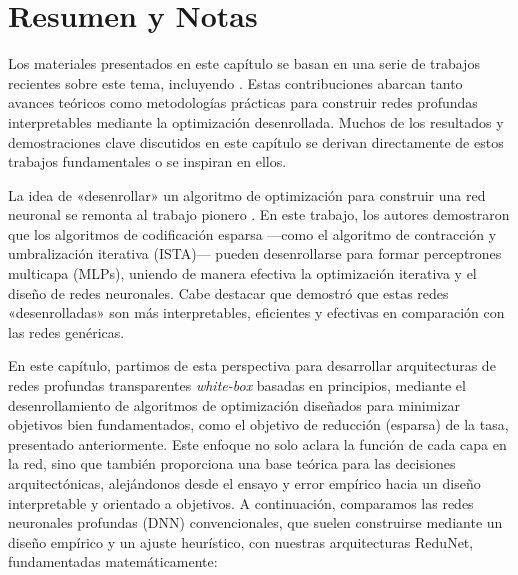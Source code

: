 \documentclass[../../book-main.tex]{subfiles}
\begin{document}
\section{Resumen y Notas}

Los materiales presentados en este capítulo se basan en una serie de
trabajos recientes sobre este tema, incluyendo \cite{chan2021redunet,
wang2024global, wang2025attention, wu2025token, yu2023white}. Estas
contribuciones abarcan tanto avances teóricos como metodologías prácticas
para construir redes profundas interpretables mediante
la optimización desenrollada. Muchos de los resultados y demostraciones clave discutidos 
en este capítulo se derivan directamente de estos
trabajos fundamentales o se inspiran en ellos.

La idea de «desenrollar» un algoritmo de optimización para construir una red neuronal
se remonta al trabajo pionero \cite{gregor2010learning}. En
este trabajo, los autores demostraron que los algoritmos de codificación
esparsa ---como el algoritmo de contracción y umbralización iterativa
(ISTA)--- pueden desenrollarse para formar perceptrones multicapa (MLPs),
uniendo de manera efectiva la optimización iterativa y el diseño de redes neuronales.
Cabe destacar que \cite{monga2019algorithm} demostró que estas
redes «desenrolladas» son más interpretables, eficientes y efectivas
en comparación con las redes genéricas.

En este capítulo, partimos de esta perspectiva para desarrollar arquitecturas de 
redes profundas transparentes \textit{white-box} basadas en principios,
mediante el desenrollamiento de algoritmos de optimización
diseñados para minimizar objetivos bien fundamentados,
como el objetivo de reducción (esparsa) de la tasa, presentado
anteriormente. Este enfoque no solo aclara la función de cada capa en
la red, sino que también proporciona una base teórica para las decisiones
arquitectónicas, alejándonos desde el ensayo y error empírico hacia un diseño
interpretable y orientado a objetivos. A continuación, comparamos las redes neuronales profundas (DNN) convencionales,
que suelen construirse mediante un diseño empírico y
un ajuste heurístico, con nuestras arquitecturas ReduNet, fundamentadas matemáticamente:
\end{document}
